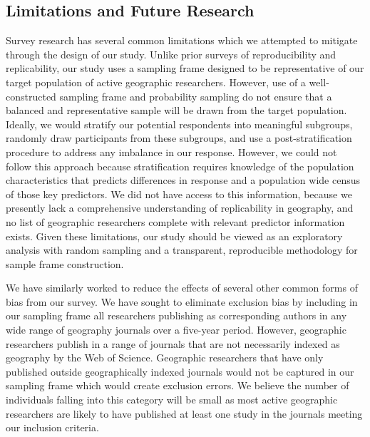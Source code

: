\documentclass[]{interact}
\theoremstyle{plain}%
\theoremstyle{definition}
\theoremstyle{remark}
\begin{document}
\subsection*{Limitations and Future Research} 
Survey research has several common limitations which we attempted to mitigate through the design of our study. 
Unlike prior surveys of reproducibility and replicability, our study uses a sampling frame designed to be representative of our target population of active geographic researchers. 
However, use of a well-constructed sampling frame and probability sampling do not ensure that a balanced and representative sample will be drawn from the target population. 
Ideally, we would stratify our potential respondents into meaningful subgroups, randomly draw participants from these subgroups, and use a post-stratification procedure to address any imbalance in our response. 
However, we could not follow this approach because stratification requires knowledge of the population characteristics that predicts differences in response and a population wide census of those key predictors.
We did not have access to this information, because we presently lack a comprehensive understanding of replicability in geography, and no list of geographic researchers complete with relevant predictor information exists.
Given these limitations, our study should be viewed as an exploratory analysis with random sampling and a transparent, reproducible methodology for sample frame construction.

We have similarly worked to reduce the effects of several other common forms of bias from our survey.
We have sought to eliminate exclusion bias by including in our sampling frame all researchers publishing as corresponding authors in any wide range of geography journals over a five-year period.
However, geographic researchers publish in a range of journals that are not necessarily indexed as geography by the Web of Science. 
Geographic researchers that have only published outside geographically indexed journals would not be captured in our sampling frame which would create exclusion errors. 
We believe the number of individuals falling into this category will be small as most active geographic researchers are likely to have published at least one study in the journals meeting our inclusion criteria.
\end{document}
